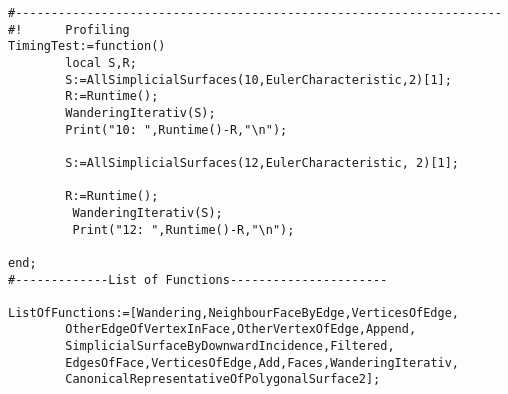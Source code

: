 \documentclass[12pt,titlepage,twoside,cleardoublepage]{article}
\theoremstyle{nummermitklammern}
\numberwithin{equation}{section}
\begin{document}
\begin{linenumbers}
\begin{verbatim}
#--------------------------------------------------------------------
#!      Profiling
TimingTest:=function()
        local S,R;
        S:=AllSimplicialSurfaces(10,EulerCharacteristic,2)[1];
        R:=Runtime();
        WanderingIterativ(S);
        Print("10: ",Runtime()-R,"\n");

        S:=AllSimplicialSurfaces(12,EulerCharacteristic, 2)[1];

        R:=Runtime();
         WanderingIterativ(S);
         Print("12: ",Runtime()-R,"\n");

end;
#-------------List of Functions----------------------

ListOfFunctions:=[Wandering,NeighbourFaceByEdge,VerticesOfEdge,
        OtherEdgeOfVertexInFace,OtherVertexOfEdge,Append,
        SimplicialSurfaceByDownwardIncidence,Filtered,
        EdgesOfFace,VerticesOfEdge,Add,Faces,WanderingIterativ,
        CanonicalRepresentativeOfPolygonalSurface2];

\end{verbatim}
\end{linenumbers}
\cleardoublepage
 \nocite{*}
 

\end{document}
